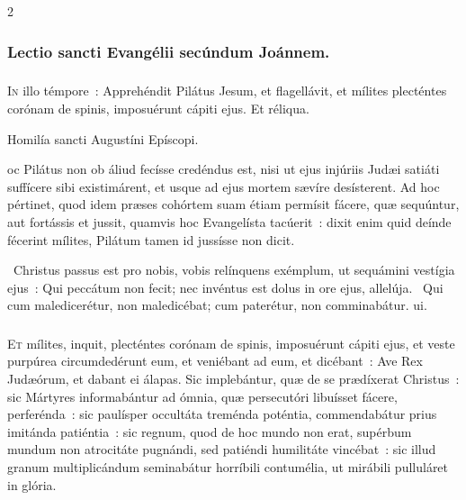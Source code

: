 \documentclass[9pt,twoside]{extarticle}
\begin{document}
\begin{multicols}{2}
{{\subsubsection*{\center Lectio sancti Evangélii secúndum Joánnem.}
\subsubsection*{\center {}}
\lettrine{I}n illo témpore~: Apprehéndit Pilátus Jesum, et flagellávit, et mílites plecténtes corónam de spinis, imposuérunt cápiti ejus. Et réliqua.

\begin{center}Homilía sancti Augustíni Epíscopi.\\
\end{center}
oc Pilátus non ob áliud fecísse credéndus est, nisi ut ejus injúriis Judæi satiáti suffícere sibi existimárent, et usque ad ejus mortem sævíre desísterent. Ad hoc pértinet, quod idem præses cohórtem suam étiam permísit fácere, quæ sequúntur, aut fortássis et jussit, quamvis hoc Evangelísta tacúerit~: dixit enim quid deínde fécerint mílites, Pilátum tamen id jussísse non dicit.

\begin{tightlist}{}
\item {}~Christus passus est pro nobis, vobis relínquens exémplum, ut sequámini vestígia ejus~: \textred{*} Qui peccátum non fecit; nec invéntus est dolus in ore ejus, allelúja. ~Qui cum maledicerétur, non maledicébat; cum paterétur, non comminabátur. ui. 
\item {}
\end{tightlist}

\subsubsection*{\center {}}
\lettrine{E}t mílites, inquit, plecténtes corónam de spinis, imposuérunt cápiti ejus, et veste purpúrea circumdedérunt eum, et veniébant ad eum, et dicébant~: Ave Rex Judæórum, et dabant ei álapas. Sic implebántur, quæ de se prædíxerat Christus~: sic Mártyres informabántur ad ómnia, quæ persecutóri libuísset fácere, perferénda~: sic paulísper occultáta treménda poténtia, commendabátur prius imitánda patiéntia~: sic regnum, quod de hoc mundo non erat, supérbum mundum non atrocitáte pugnándi, sed patiéndi humilitáte vincébat~: sic illud granum multiplicándum seminabátur horríbili contumélia, ut mirábili pulluláret in glória.

}}
\end{multicols}
\end{document}
